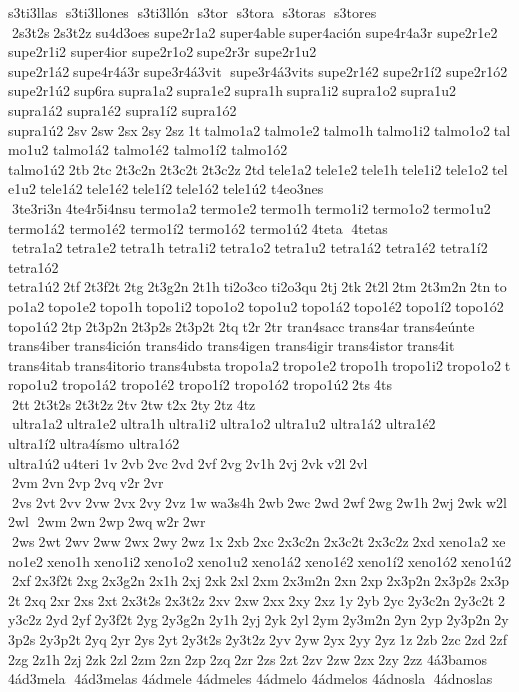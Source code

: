 s3ti3llas  s3ti3llones  s3ti3llón  s3tor  s3tora  s3toras  s3tores  2s3t2s 2s3t2z su4d3oes 	supe2r1a2 
super4able super4ación 
supe4r4a3r 	supe2r1e2 	supe2r1i2 	super4ior 	supe2r1o2 supe2r3r 	supe2r1u2 
supe2r1á2 supe4r4á3r supe3r4á3vit  supe3r4á3vits  
supe2r1é2 
supe2r1í2 
supe2r1ó2 
supe2r1ú2 sup6ra supra1a2 supra1e2 supra1h supra1i2 supra1o2 supra1u2 	supra1á2 	supra1é2 	supra1í2 	supra1ó2 	supra1ú2 2sv 2sw 2sx 2sy 2sz 1t talmo1a2 talmo1e2 talmo1h talmo1i2 talmo1o2 talmo1u2 	talmo1á2 	talmo1é2 	talmo1í2 	talmo1ó2 	talmo1ú2 2tb 2tc 2t3c2n 2t3c2t 2t3c2z 2td tele1a2 tele1e2 tele1h tele1i2 tele1o2 tele1u2 tele1á2 tele1é2 tele1í2 tele1ó2 tele1ú2 	t4eo3nes  3te3ri3n 4te4r5i4nsu termo1a2 termo1e2 termo1h termo1i2 termo1o2 termo1u2 	termo1á2 	termo1é2 	termo1í2 	termo1ó2 	termo1ú2 4teta  4tetas  tetra1a2 tetra1e2 tetra1h tetra1i2 tetra1o2 tetra1u2 	tetra1á2 	tetra1é2 	tetra1í2 	tetra1ó2 	tetra1ú2 2tf 2t3f2t 2tg 2t3g2n 2t1h ti2o3co ti2o3qu 2tj 2tk 2t2l 2tm 2t3m2n 2tn topo1a2 topo1e2 topo1h topo1i2 topo1o2 topo1u2 topo1á2 topo1é2 topo1í2 topo1ó2 topo1ú2 2tp 2t3p2n 2t3p2s 2t3p2t 2tq t2r 2tr  	tran4sacc trans4ar trans4eúnte 
trans4iber trans4ición 	trans4ido 
trans4igen 
trans4igir trans4istor trans4it 
trans4itab trans4itorio trans4ubsta tropo1a2 tropo1e2 tropo1h tropo1i2 tropo1o2 tropo1u2 	tropo1á2 	tropo1é2 	tropo1í2 	tropo1ó2 	tropo1ú2 2ts 4ts  2tt 2t3t2s 2t3t2z 2tv 2tw t2x 2ty 2tz 4tz  ultra1a2 ultra1e2 ultra1h ultra1i2 ultra1o2 ultra1u2 	ultra1á2 	ultra1é2 	ultra1í2 ultra4ísmo 	ultra1ó2 	ultra1ú2 u4teri 1v 2vb 2vc 2vd 2vf 2vg 2v1h 2vj 2vk v2l 2vl  2vm 2vn 2vp 2vq v2r 2vr  2vs 2vt 2vv 2vw 2vx 2vy 2vz 1w wa3s4h 2wb 2wc 2wd 2wf 2wg 2w1h 2wj 2wk w2l 2wl  2wm 2wn 2wp 2wq w2r 2wr  2ws 2wt 2wv 2ww 2wx 2wy 2wz 1x 2xb 2xc 2x3c2n 2x3c2t 2x3c2z 2xd xeno1a2 xeno1e2 xeno1h xeno1i2 xeno1o2 xeno1u2 xeno1á2 xeno1é2 xeno1í2 xeno1ó2 xeno1ú2 2xf 2x3f2t 2xg 2x3g2n 2x1h 2xj 2xk 2xl 2xm 2x3m2n 2xn 2xp 2x3p2n 2x3p2s 2x3p2t 2xq 2xr 2xs 2xt 2x3t2s 2x3t2z 2xv 2xw 2xx 2xy 2xz 1y 2yb 2yc 2y3c2n 2y3c2t 2y3c2z 2yd 2yf 2y3f2t 2yg 2y3g2n 2y1h 2yj 2yk 2yl 2ym 2y3m2n 2yn 2yp 2y3p2n 2y3p2s 2y3p2t 2yq 2yr 2ys 2yt 2y3t2s 2y3t2z 2yv 2yw 2yx 2yy 2yz 1z 2zb 2zc 2zd 2zf 2zg 2z1h 2zj 2zk 2zl 2zm 2zn 2zp 2zq 2zr 2zs 2zt 2zv 2zw 2zx 2zy 2zz 
4á3bamos  
4ád3mela  4ád3melas  	4ádmele  
4ádmeles  	4ádmelo  
4ádmelos  
4ádnosla  4ádnoslas  
